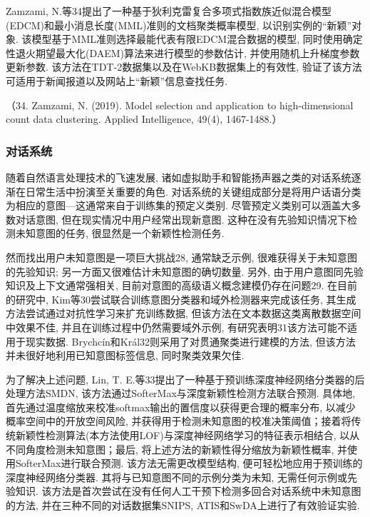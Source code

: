 \documentclass{Style/aas}
\begin{document}
\begin{multicols}{2}
  Zamzami, N.等34提出了一种基于狄利克雷复合多项式指数族近似混合模型(EDCM)和最小消息长度(MML)准则的文档聚类概率模型, 以识别实例的“新颖”对象. 该模型基于MML准则选择最能代表有限EDCM混合数据的模型, 同时使用确定性退火期望最大化(DAEM)算法来进行模型的参数估计, 并使用随机上升梯度参数更新参数. 该方法在TDT-2数据集以及在WebKB数据集上的有效性, 验证了该方法可适用于新闻报道以及网站上“新颖”信息查找任务. 

  （34.	Zamzami, N. (2019). Model selection and application to high-dimensional count data clustering. Applied Intelligence, 49(4), 1467-1488.）
  
  \subsubsection{对话系统}
  随着自然语言处理技术的飞速发展, 诸如虚拟助手和智能扬声器之类的对话系统逐渐在日常生活中扮演至关重要的角色. 对话系统的关键组成部分是将用户话语分类为相应的意图—这通常来自于训练集的预定义类别. 尽管预定义类别可以涵盖大多数对话意图, 但在现实情况中用户经常出现新意图. 这种在没有先验知识情况下检测未知意图的任务, 很显然是一个新颖性检测任务. 

  然而找出用户未知意图是一项巨大挑战28, 通常缺乏示例, 很难获得关于未知意图的先验知识; 另一方面又很难估计未知意图的确切数量. 另外, 由于用户意图同先验知识及上下文通常强相关, 目前对意图的高级语义概念建模仍存在问题29. 在目前的研究中, Kim等30尝试联合训练意图分类器和域外检测器来完成该任务, 其生成方法尝试通过对抗性学习来扩充训练数据, 但该方法在文本数据这类离散数据空间中效果不佳, 并且在训练过程中仍然需要域外示例, 有研究表明31该方法可能不适用于现实数据. Brychcín和Král32则采用了对贯通聚类进行建模的方法, 但该方法并未很好地利用已知意图标签信息, 同时聚类效果欠佳. 

  为了解决上述问题, Lin, T. E.等33提出了一种基于预训练深度神经网络分类器的后处理方法SMDN, 该方法通过SofterMax与深度新颖性检测方法联合预测. 具体地, 首先通过温度缩放来校准softmax输出的置信度以获得更合理的概率分布, 以减少概率空间中的开放空间风险, 并获得用于检测未知意图的校准决策阈值；接着将传统新颖性检测算法(本方法使用LOF)与深度神经网络学习的特征表示相结合, 以从不同角度检测未知意图；最后, 将上述方法的新颖性得分缩放为新颖性概率, 并使用SofterMax进行联合预测. 该方法无需更改模型结构, 便可轻松地应用于预训练的深度神经网络分类器. 其将与已知意图不同的示例分类为未知, 无需任何示例或先验知识. 该方法是首次尝试在没有任何人工干预下检测多回合对话系统中未知意图的方法, 并在三种不同的对话数据集SNIPS, ATIS和SwDA上进行了有效验证实验. 


\end{multicols}
\end{document}

